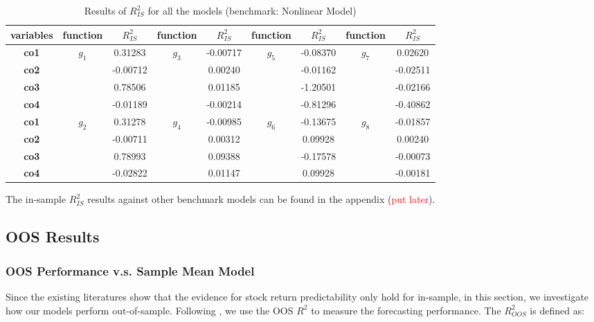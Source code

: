 \documentclass[a4paper,12pt,times,numbered,print,index]{report}
\numberwithin{equation}{section}
\begin{document}
\begin{table}[!htbp]
	\centering
	\caption{Results of $R^2_{IS}$ for all the models (benchmark: Nonlinear Model)}
	\begin{adjustbox}{max width=\textwidth}
		\begin{tabular}{ccccccccc}
			\toprule
			\textbf{variables} & \textbf{function} & \textbf{$R^2_{IS}$} & \textbf{function} & \textbf{$R^2_{IS}$} & \textbf{function} & \textbf{$R^2_{IS}$} & \textbf{function} & \textbf{$R^2_{IS}$} \\
			\midrule
		\textbf{co1} & \multirow{4}[2]{*}{$g_1$} & 0.31283 & \multirow{4}[2]{*}{$g_3$} & -0.00717 & \multirow{4}[2]{*}{$g_5$} & -0.08370 & \multirow{4}[2]{*}{$g_7$} & 0.02620 \\
		\textbf{co2} &       & -0.00712 &       & 0.00240 &       & -0.01162 &       & -0.02511 \\
		\textbf{co3} &       & 0.78506 &       & 0.01185 &       & -1.20501 &       & -0.02166 \\
		\textbf{co4} &       & -0.01189 &       & -0.00214 &       & -0.81296 &       & -0.40862 \\
		\midrule
		\textbf{co1} & \multirow{4}[2]{*}{$g_2$} & 0.31278 & \multirow{4}[2]{*}{$g_4$} & -0.00985 & \multirow{4}[2]{*}{$g_6$} & -0.13675 & \multirow{4}[2]{*}{$g_8$} & -0.01857 \\
		\textbf{co2} &       & -0.00711 &       & 0.00312 &       & 0.09928 &       & 0.00240 \\
		\textbf{co3} &       & 0.78993 &       & 0.09388 &       & -0.17578 &       & -0.00073 \\
		\textbf{co4} &       & -0.02822 &       & 0.01147 &       & 0.09928 &       & -0.00181 \\
		\bottomrule
		\bottomrule
	\end{tabular}%
	\end{adjustbox}
	\label{ins_R2_NLS}%
\end{table}%

The in-sample $R^2_{IS}$ results against other benchmark models can be found in the appendix (\textcolor{red}{put later}). 

\subsection{OOS Results}

\subsubsection{OOS Performance v.s. Sample Mean Model}
Since the existing literatures show that the evidence for stock return predictability only hold for in-sample, in this section, we investigate how our models perform out-of-sample. Following \cite{campbell2008predicting}, we use the OOS $R^2$ to measure the forecasting performance. The $R^2_{OOS}$ is defined as:
\end{document}
